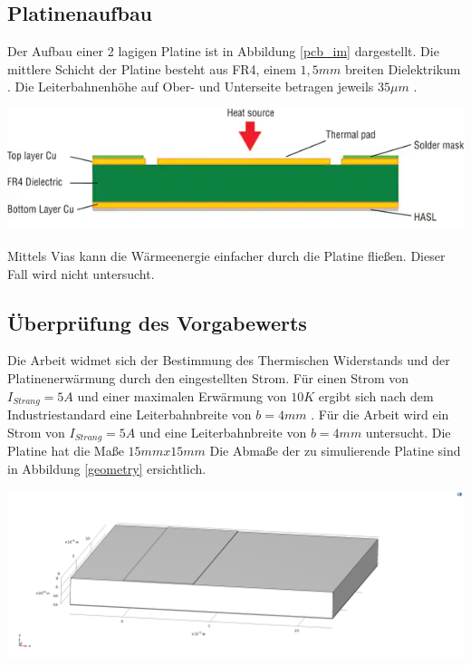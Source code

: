 \documentclass[10pt,a4paper,oneside,abstracton]{scrartcl}
\newenvironment{Figure}
  {\par\medskip\noindent\minipage{\linewidth}}
  {\endminipage\par\medskip}
\begin{document}
\begin{multicols}{2}
\subsection{Platinenaufbau}
Der Aufbau einer 2 lagigen Platine ist in Abbildung \ref*{pcb_im} dargestellt. 
\newline
Die mittlere Schicht der Platine besteht aus FR4, einem $ 1,5mm $ breiten Dielektrikum \cite{PCB_Querschnitt}. 
Die Leiterbahnenhöhe auf Ober- und Unterseite betragen jeweils $ 35 \mu m$ \cite{aisler}.
\begin{Figure}
	\includegraphics[width=\textwidth]{Bilder/PCB_Querschnitt.png}
	\label{pcb_im}
\end{Figure}

\noindent
Mittels Vias kann die Wärmeenergie einfacher durch die Platine fließen. 
Dieser Fall wird nicht untersucht.

\noindent



\subsection{Überprüfung des Vorgabewerts}
Die Arbeit widmet sich der Bestimmung des Thermischen Widerstands und der 
Platinenerwärmung durch den eingestellten Strom. 
\newline
Für einen Strom von $I_{Strang} = 5 A $ und einer maximalen Erwärmung von $10 K$ ergibt sich nach dem Industriestandard eine
Leiterbahnbreite von $b = 4 mm $ \cite{ipc}. \newline
Für die Arbeit wird ein Strom von $I_{Strang} = 5 A $ und eine Leiterbahnbreite von $b = 4 mm $ untersucht.
Die Platine hat die Maße $15mm x 15mm$
Die Abmaße der zu simulierende Platine sind in Abbildung \ref*{geometry} ersichtlich.


\begin{Figure}
	\includegraphics[width=\textwidth]{Bilder/Geometrie.png}
	\label{geometry}
\end{Figure}



\end{multicols}
\end{document}

